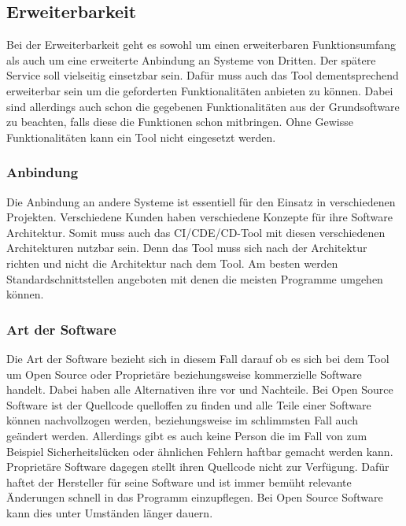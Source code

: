 \subsection{Erweiterbarkeit}
Bei der Erweiterbarkeit geht es sowohl um einen erweiterbaren Funktionsumfang als auch um eine erweiterte Anbindung an Systeme von Dritten. Der spätere Service soll vielseitig einsetzbar sein. Dafür muss auch das Tool dementsprechend erweiterbar sein um die geforderten Funktionalitäten anbieten zu können. Dabei sind allerdings auch schon die gegebenen Funktionalitäten aus der Grundsoftware zu beachten, falls diese die Funktionen schon mitbringen. Ohne Gewisse Funktionalitäten kann ein Tool nicht eingesetzt werden.
\subsubsection{Anbindung}
Die Anbindung an andere Systeme ist essentiell für den Einsatz in verschiedenen Projekten. Verschiedene Kunden haben verschiedene Konzepte für ihre Software Architektur. Somit muss auch das \ac{CI}/\ac{CDE}/\ac{CD}-Tool mit diesen verschiedenen Architekturen nutzbar sein. Denn das Tool muss sich nach der Architektur richten und nicht die Architektur nach dem Tool. Am besten werden Standardschnittstellen angeboten mit denen die meisten Programme umgehen können.
\subsubsection{Art der Software}
Die Art der Software bezieht sich in diesem Fall darauf ob es sich bei dem Tool um  Open Source oder Proprietäre beziehungsweise kommerzielle Software handelt. Dabei haben alle Alternativen ihre vor und Nachteile. Bei Open Source Software ist der Quellcode quelloffen zu finden und alle Teile einer Software können nachvollzogen werden, beziehungsweise im schlimmsten Fall auch geändert werden. Allerdings gibt es auch keine Person die im Fall von zum Beispiel Sicherheitslücken oder ähnlichen Fehlern haftbar gemacht werden kann. Proprietäre Software dagegen stellt ihren Quellcode nicht zur Verfügung. Dafür haftet der Hersteller für seine Software und ist immer bemüht relevante Änderungen schnell in das Programm einzupflegen. Bei Open Source Software kann dies unter Umständen länger dauern.

